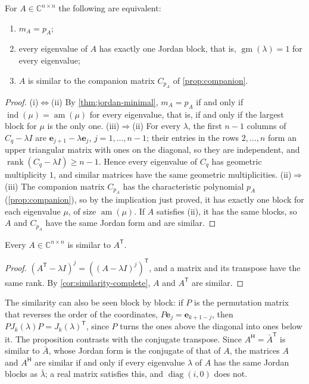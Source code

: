 \begin{proposition}
\label{prop:nonderogatory}
For $A\in\mathbb C^{n\times n}$ the following are equivalent:
\begin{enumerate}
\item $m_A=p_A$;
\item every eigenvalue of $A$ has exactly one Jordan block, that is, $\operatorname{gm}(\lambda)=1$ for every eigenvalue;
\item $A$ is similar to the companion matrix $C_{p_A}$ of \cref{prop:companion}.
\end{enumerate}
\end{proposition}

\begin{proof}
(i)$\Leftrightarrow$(ii) By \cref{thm:jordan-minimal}, $m_A=p_A$ if and only if $\operatorname{ind}(\mu)=\operatorname{am}(\mu)$ for every eigenvalue, that is, if and only if the largest block for $\mu$ is the only one. (iii)$\Rightarrow$(ii) For every $\lambda$, the first $n-1$ columns of $C_q-\lambda I$ are $\mathbf e_{j+1}-\lambda\mathbf e_j$, $j=1,\ldots,n-1$; their entries in the rows $2,\ldots,n$ form an upper triangular matrix with ones on the diagonal, so they are independent, and $\operatorname{rank}(C_q-\lambda I)\ge n-1$. Hence every eigenvalue of $C_q$ has geometric multiplicity $1$, and similar matrices have the same geometric multiplicities. (ii)$\Rightarrow$(iii) The companion matrix $C_{p_A}$ has the characteristic polynomial $p_A$ (\cref{prop:companion}), so by the implication just proved, it has exactly one block for each eigenvalue $\mu$, of size $\operatorname{am}(\mu)$. If $A$ satisfies (ii), it has the same blocks, so $A$ and $C_{p_A}$ have the same Jordan form and are similar.
\end{proof}

\begin{proposition}
\label{prop:transpose-similar}
Every $A\in\mathbb C^{n\times n}$ is similar to $A^{\mathsf T}$.
\end{proposition}

\begin{proof}
$(A^{\mathsf T}-\lambda I)^j=((A-\lambda I)^j)^{\mathsf T}$, and a matrix and its transpose have the same rank. By \cref{cor:similarity-complete}, $A$ and $A^{\mathsf T}$ are similar.
\end{proof}

The similarity can also be seen block by block: if $P$ is the permutation matrix that reverses the order of the coordinates, $P\mathbf e_j=\mathbf e_{k+1-j}$, then $PJ_k(\lambda)P=J_k(\lambda)^{\mathsf T}$, since $P$ turns the ones above the diagonal into ones below it. The proposition contrasts with the conjugate transpose. Since $A^{\mathsf H}=\bar A^{\mathsf T}$ is similar to $\bar A$, whose Jordan form is the conjugate of that of $A$, the matrices $A$ and $A^{\mathsf H}$ are similar if and only if every eigenvalue $\lambda$ of $A$ has the same Jordan blocks as $\bar\lambda$; a real matrix satisfies this, and $\operatorname{diag}(i,0)$ does not.


